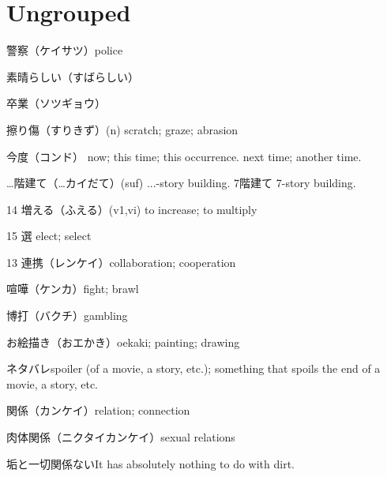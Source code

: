 \section{Ungrouped}

警察（ケイサツ）police

素晴らしい（すばらしい）

卒業（ソツギョウ）

擦り傷（すりきず）(n) scratch; graze; abrasion

今度（コンド）
now; this time; this occurrence.
next time; another time.

…階建て（…カイだて）(suf) ...-story building.
7階建て 7-story building.

14 増える（ふえる）(v1,vi) to increase; to multiply

15 選 elect; select

13 連携（レンケイ）collaboration; cooperation

喧嘩（ケンカ）fight; brawl

博打（バクチ）gambling

お絵描き（おエかき）oekaki; painting; drawing

ネタバレspoiler (of a movie, a story, etc.); something that spoils the end of a movie, a story, etc.

関係（カンケイ）relation; connection

肉体関係（ニクタイカンケイ）sexual relations

垢と一切関係ないIt has absolutely nothing to do with dirt.
